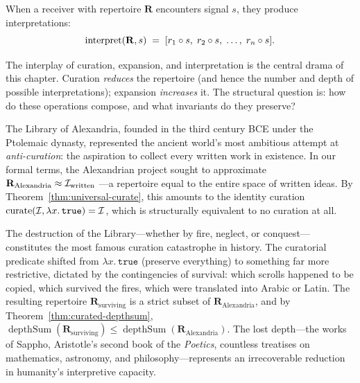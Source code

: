 \begin{definition}[Interpretation]
\label{def:interpret-ch15}
When a receiver with repertoire $\mathbf{R}$ encounters signal $s$, they
produce interpretations:
\[
  \operatorname{interpret}(\mathbf{R}, s)
  \;=\; [r_1 \circ s,\; r_2 \circ s,\; \dots,\; r_n \circ s].
\]
\end{definition}

The interplay of curation, expansion, and interpretation is the central
drama of this chapter.  Curation \emph{reduces} the repertoire (and hence
the number and depth of possible interpretations); expansion
\emph{increases} it.  The structural question is: how do these operations
compose, and what invariants do they preserve?

\begin{example}
\label{ex:alexandria}
The Library of Alexandria, founded in the third century BCE under the
Ptolemaic dynasty, represented the ancient world's most ambitious attempt
at \emph{anti-curation}: the aspiration to collect every written work in
existence.  In our formal terms, the Alexandrian project sought to
approximate $\mathbf{R}_{\text{Alexandria}} \approx \mathcal{I}_{\text{written}}$
---a repertoire equal to the entire space of written ideas.  By
Theorem~\ref{thm:universal-curate}, this amounts to the identity
curation $\operatorname{curate}(\mathcal{I}, \lambda x.\, \texttt{true}) = \mathcal{I}$,
which is structurally equivalent to no curation at all.

The destruction of the Library---whether by fire, neglect, or
conquest---constitutes the most famous curation catastrophe in history.
The curatorial predicate shifted from $\lambda x.\, \texttt{true}$
(preserve everything) to something far more restrictive, dictated by the
contingencies of survival: which scrolls happened to be copied, which
survived the fires, which were translated into Arabic or Latin.  The
resulting repertoire $\mathbf{R}_{\text{surviving}}$ is a strict subset
of $\mathbf{R}_{\text{Alexandria}}$, and by
Theorem~\ref{thm:curated-depthsum},
$\operatorname{depthSum}(\mathbf{R}_{\text{surviving}}) \le
\operatorname{depthSum}(\mathbf{R}_{\text{Alexandria}})$.  The lost
depth---the works of Sappho, Aristotle's second book of the
\textit{Poetics}, countless treatises on mathematics, astronomy, and
philosophy---represents an irrecoverable reduction in humanity's
interpretive capacity.
\end{example}

